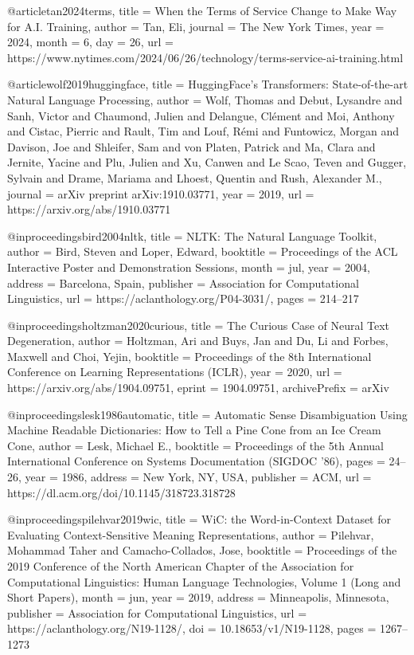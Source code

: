 \documentclass[12pt]{report}
\theoremstyle{definition}
\begin{document}
@article{tan2024terms,
  title = {When the Terms of Service Change to Make Way for {A.I.} Training},
  author = {Tan, Eli},
  journal = {The New York Times},
  year = {2024},
  month = {6},
  day = {26},
  url = {https://www.nytimes.com/2024/06/26/technology/terms-service-ai-training.html}
}

@article{wolf2019huggingface,
  title = {{HuggingFace's} Transformers: State-of-the-art Natural Language Processing},
  author = {Wolf, Thomas and Debut, Lysandre and Sanh, Victor and Chaumond, Julien and Delangue, Clément and Moi, Anthony and Cistac, Pierric and Rault, Tim and Louf, Rémi and Funtowicz, Morgan and Davison, Joe and Shleifer, Sam and von Platen, Patrick and Ma, Clara and Jernite, Yacine and Plu, Julien and Xu, Canwen and Le Scao, Teven and Gugger, Sylvain and Drame, Mariama and Lhoest, Quentin and Rush, Alexander M.},
  journal = {arXiv preprint arXiv:1910.03771},
  year = {2019},
  url = {https://arxiv.org/abs/1910.03771}
}

@inproceedings{bird2004nltk,
  title = {{NLTK}: The Natural Language Toolkit},
  author = {Bird, Steven and Loper, Edward},
  booktitle = {Proceedings of the {ACL} Interactive Poster and Demonstration Sessions},
  month = jul,
  year = {2004},
  address = {Barcelona, Spain},
  publisher = {Association for Computational Linguistics},
  url = {https://aclanthology.org/P04-3031/},
  pages = {214--217}
}

@inproceedings{holtzman2020curious,
  title = {The Curious Case of Neural Text Degeneration},
  author = {Holtzman, Ari and Buys, Jan and Du, Li and Forbes, Maxwell and Choi, Yejin},
  booktitle = {Proceedings of the 8th International Conference on Learning Representations (ICLR)},
  year = {2020},
  url = {https://arxiv.org/abs/1904.09751},
  eprint = {1904.09751},
  archivePrefix = {arXiv}
}

@inproceedings{lesk1986automatic,
  title = {Automatic Sense Disambiguation Using Machine Readable Dictionaries: How to Tell a Pine Cone from an Ice Cream Cone},
  author = {Lesk, Michael E.},
  booktitle = {Proceedings of the 5th Annual International Conference on Systems Documentation (SIGDOC '86)},
  pages = {24--26},
  year = {1986},
  address = {New York, NY, USA},
  publisher = {ACM},
  url = {https://dl.acm.org/doi/10.1145/318723.318728}
}

@inproceedings{pilehvar2019wic,
  title = {{WiC}: the Word-in-Context Dataset for Evaluating Context-Sensitive Meaning Representations},
  author = {Pilehvar, Mohammad Taher and Camacho-Collados, Jose},
  booktitle = {Proceedings of the 2019 Conference of the North {A}merican Chapter of the Association for Computational Linguistics: Human Language Technologies, Volume 1 (Long and Short Papers)},
  month = jun,
  year = {2019},
  address = {Minneapolis, Minnesota},
  publisher = {Association for Computational Linguistics},
  url = {https://aclanthology.org/N19-1128/},
  doi = {10.18653/v1/N19-1128},
  pages = {1267--1273}
}
\end{document}
